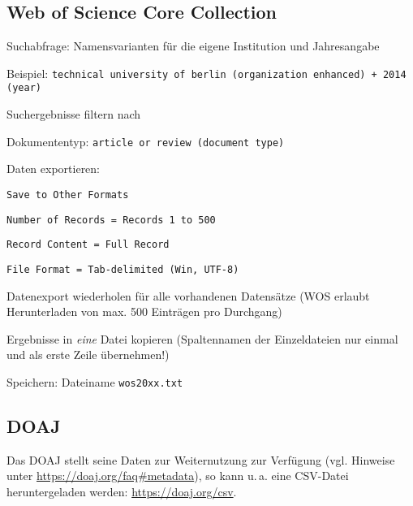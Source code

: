 \subsection*{Web of Science Core Collection}
\begin{compactitem}
\item Suchabfrage: Namensvarianten für die eigene Institution und Jahresangabe 
	\begin{compactitem}
    \item Beispiel: \texttt{technical university of berlin (organization enhanced) + 2014 (year)}
    \end{compactitem}
\item Suchergebnisse filtern nach
	\begin{compactitem}
    \item Dokumententyp: \texttt{article or review (document type)}
    \end{compactitem}
\item Daten exportieren: 
	\begin{compactitem}
	\item \texttt{Save to Other Formats}
    \item \texttt{Number of Records = Records 1 to 500}
    \item \texttt{Record Content = Full Record}
    \item \texttt{File Format = Tab-delimited (Win, UTF-8)}
	\end{compactitem}
\item Datenexport wiederholen für alle vorhandenen Datensätze (WOS erlaubt Herunterladen von max. 500 Einträgen pro Durchgang)
\item Ergebnisse in \textit{eine} Datei kopieren (Spaltennamen der Einzeldateien nur einmal und als erste Zeile übernehmen!)
\item Speichern: Dateiname \texttt{wos20xx.txt}
\end{compactitem}

\subsection*{DOAJ} 
\label{doaj}

Das DOAJ stellt seine Daten zur Weiternutzung zur Verfügung (vgl. Hinweise unter \url{https://doaj.org/faq#metadata}), so kann u.\,a. eine CSV-Datei heruntergeladen werden: \url{https://doaj.org/csv}. 

